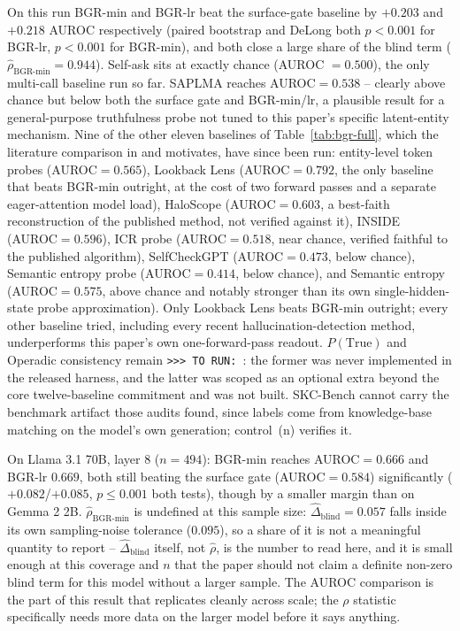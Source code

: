 \documentclass{article}
\newcommand{\TORUN}[1]{{\color{blue}\texttt{>{}>{}> TO RUN: #1}}}
\begin{document}
On this run BGR-min and BGR-lr beat the surface-gate baseline by $+0.203$ and $+0.218$ AUROC
respectively (paired bootstrap and DeLong both $p<0.001$ for BGR-lr, $p<0.001$ for BGR-min), and both
close a large share of the blind term ($\hat\rho_{\text{BGR-min}}=0.944$). Self-ask sits at exactly
chance (AUROC $=0.500$), the only multi-call baseline run so far. SAPLMA \citep{azaria2023internal}
reaches AUROC$=0.538$ -- clearly above chance but below both the surface gate and BGR-min/lr, a
plausible result for a general-purpose truthfulness probe not tuned to this paper's specific
latent-entity mechanism. Nine of the other eleven
baselines of Table~\ref{tab:bgr-full}, which the literature comparison in
\citet{hussain2026parallax,janiak2025illusion} and \citet{obeso2025realtime} motivates, have since been
run: entity-level token probes (AUROC$=0.565$), Lookback Lens (AUROC$=0.792$, the only baseline that
beats BGR-min outright, at the cost of two forward passes and a separate eager-attention model load),
HaloScope (AUROC$=0.603$, a best-faith reconstruction of the published method, not verified against it),
INSIDE (AUROC$=0.596$), ICR probe (AUROC$=0.518$, near chance, verified faithful to the published
algorithm), SelfCheckGPT (AUROC$=0.473$, below chance), Semantic entropy probe (AUROC$=0.414$, below
chance), and Semantic entropy (AUROC$=0.575$, above chance and notably stronger than its own
single-hidden-state probe approximation). Only Lookback Lens beats BGR-min outright; every other
baseline tried, including every recent hallucination-detection method, underperforms this paper's own
one-forward-pass readout. $P(\text{True})$ \citep{kadavath2022know} and Operadic consistency
\citep{bottman2026operadic} remain \TORUN{}: the former was never implemented in the released harness,
and the latter was scoped as an optional extra beyond the core twelve-baseline commitment and was not
built. SKC-Bench cannot
carry the benchmark artifact those audits found, since labels come from knowledge-base matching on the model's own generation;
control~(n) verifies it.

On Llama 3.1 70B, layer 8 ($n=494$): BGR-min reaches AUROC$=0.666$ and BGR-lr $0.669$, both still
beating the surface gate (AUROC$=0.584$) significantly ($+0.082$/$+0.085$, $p\le0.001$ both tests),
though by a smaller margin than on Gemma 2 2B. $\hat\rho_{\text{BGR-min}}$ is undefined at this
sample size: $\widehat\Delta_{\mathrm{blind}}=0.057$ falls inside its own sampling-noise tolerance
($0.095$), so a share of it is not a meaningful quantity to report -- $\widehat\Delta_{\mathrm{blind}}$
itself, not $\hat\rho$, is the number to read here, and it is small enough at this coverage and $n$
that the paper should not claim a definite non-zero blind term for this model without a larger sample.
The AUROC comparison is the part of this result that replicates cleanly across scale; the $\rho$
statistic specifically needs more data on the larger model before it says anything.
\end{document}
